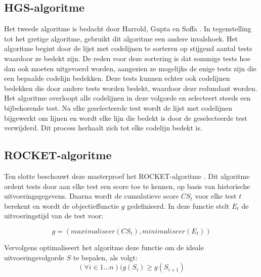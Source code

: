 \subsection{HGS-algoritme}
\noindent Het tweede algoritme is bedacht door Harrold, Gupta en Soffa \cite{hgs}. In tegenstelling tot het gretige algoritme, gebruikt dit algoritme een andere invalshoek. Het algoritme begint door de lijst met codelijnen te sorteren op stijgend aantal tests waardoor ze bedekt zijn. De reden voor deze sortering is dat sommige tests hoe dan ook moeten uitgevoerd worden, aangezien ze mogelijks de enige tests zijn die een bepaalde codelijn bedekken. Deze tests kunnen echter ook codelijnen bedekken die door andere tests worden bedekt, waardoor deze redundant worden. Het algoritme overloopt alle codelijnen in deze volgorde en selecteert steeds een bijbehorende test. Na elke geselecteerde test wordt de lijst met codelijnen bijgewerkt om lijnen en wordt elke lijn die bedekt is door de geselecteerde test verwijderd. Dit process herhaalt zich tot elke codelijn bedekt is.

\subsection{ROCKET-algoritme}
\noindent Ten slotte beschouwt deze masterproef het ROCKET-algoritme \cite{6676952}. Dit algoritme ordent tests door aan elke test een score toe te kennen, op basis van historische uitvoeringsgegevens. Daarna wordt de cumulatieve score $CS_t$ voor elke test $t$ berekent en wordt de objectieffunctie $g$ gedefinieerd. In deze functie stelt $E_t$ de uitvoeringstijd van de test voor:

$$g = (maximaliseer(CS_t), minimaliseer(E_t))$$

\noindent Vervolgens optimaliseert het algoritme deze functie om de ideale uitvoeringsvolgorde $S$ te bepalen, als volgt:
$$(\forall i \in 1 \dots n)(g(S_i) \ge g(S_{i+1})$$